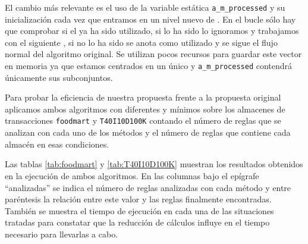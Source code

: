 El cambio más relevante es el uso de la variable estática \texttt{a\_m\_processed} y su inicialización cada vez que entramos en un nivel nuevo de \aprioriL. En el bucle sólo hay que comprobar si el \itemset ya ha sido utilizado, si lo ha sido lo ignoramos y trabajamos con el siguiente \itemset, si no lo ha sido se anota como utilizado y se sigue el flujo normal del algoritmo original. Se utilizan pocos recursos para guardar este vector en memoria ya que estamos centrados en un único \kitemset y \texttt{a\_m\_processed} contendrá únicamente sus subconjuntos.









Para probar la eficiencia de nuestra propuesta frente a la propuesta original aplicamos ambos algoritmos con diferentes \soportes y \confianzas mínimos sobre los almacenes de transacciones \texttt{foodmart} y \texttt{T40I10D100K} contando el número de reglas que se analizan con cada uno de los métodos y el número de reglas que contiene cada almacén \D en esas condiciones.%

Las tablas \ref{tab:foodmart} y \ref{tab:T40I10D100K} muestran los resultados obtenidos en la ejecución de ambos algoritmos. En las columnas bajo el epígrafe "`analizadas"' se indica el número de reglas analizadas con cada método y entre paréntesis la relación entre este valor y las reglas finalmente encontradas. También se muestra el tiempo de ejecución en cada una de las situaciones tratadas para constatar que la reducción de cálculos influye en el tiempo necesario para llevarlas a cabo.

